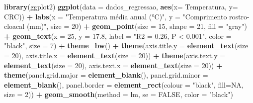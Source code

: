 \documentclass[
]{book}
\newenvironment{Shaded}{\begin{snugshade}}{\end{snugshade}}
\newcommand{\DataTypeTok}[1]{\textcolor[rgb]{0.13,0.29,0.53}{#1}}
\newcommand{\DecValTok}[1]{\textcolor[rgb]{0.00,0.00,0.81}{#1}}
\newcommand{\FloatTok}[1]{\textcolor[rgb]{0.00,0.00,0.81}{#1}}
\newcommand{\KeywordTok}[1]{\textcolor[rgb]{0.13,0.29,0.53}{\textbf{#1}}}
\newcommand{\NormalTok}[1]{#1}
\newcommand{\OperatorTok}[1]{\textcolor[rgb]{0.81,0.36,0.00}{\textbf{#1}}}
\newcommand{\OtherTok}[1]{\textcolor[rgb]{0.56,0.35,0.01}{#1}}
\newcommand{\StringTok}[1]{\textcolor[rgb]{0.31,0.60,0.02}{#1}}
\begin{document}
\begin{Shaded}
\begin{Highlighting}[]
\KeywordTok{library}\NormalTok{(ggplot2)}
\KeywordTok{ggplot}\NormalTok{(}\DataTypeTok{data =}\NormalTok{ dados_regressao, }\KeywordTok{aes}\NormalTok{(}\DataTypeTok{x=}\NormalTok{ Temperatura, }\DataTypeTok{y=}\NormalTok{ CRC)) }\OperatorTok{+}\StringTok{ }
\StringTok{  }\KeywordTok{labs}\NormalTok{(}\DataTypeTok{x =} \StringTok{"Temperatura média anual (°C)"}\NormalTok{, }\DataTypeTok{y =} \StringTok{"Comprimento rostro-cloacal (mm)"}\NormalTok{, }\DataTypeTok{size =} \DecValTok{20}\NormalTok{) }\OperatorTok{+}
\StringTok{  }\KeywordTok{geom_point}\NormalTok{(}\DataTypeTok{size =} \DecValTok{15}\NormalTok{, }\DataTypeTok{shape =} \DecValTok{21}\NormalTok{, }\DataTypeTok{fill =} \StringTok{"gray"}\NormalTok{) }\OperatorTok{+}
\StringTok{  }\KeywordTok{geom_text}\NormalTok{(}\DataTypeTok{x =} \DecValTok{25}\NormalTok{, }\DataTypeTok{y =} \FloatTok{17.8}\NormalTok{, }\DataTypeTok{label =} \StringTok{"R2 = 0.26, P < 0.001"}\NormalTok{, }\DataTypeTok{color =} \StringTok{"black"}\NormalTok{, }\DataTypeTok{size =} \DecValTok{7}\NormalTok{) }\OperatorTok{+}
\StringTok{  }\KeywordTok{theme_bw}\NormalTok{() }\OperatorTok{+}
\StringTok{  }\KeywordTok{theme}\NormalTok{(}\DataTypeTok{axis.title.y =} \KeywordTok{element_text}\NormalTok{(}\DataTypeTok{size =} \DecValTok{20}\NormalTok{), }\DataTypeTok{axis.title.x =} \KeywordTok{element_text}\NormalTok{(}\DataTypeTok{size =} \DecValTok{20}\NormalTok{)) }\OperatorTok{+}
\StringTok{  }\KeywordTok{theme}\NormalTok{(}\DataTypeTok{axis.text.y =} \KeywordTok{element_text}\NormalTok{(}\DataTypeTok{size =} \DecValTok{20}\NormalTok{), }\DataTypeTok{axis.text.x =} \KeywordTok{element_text}\NormalTok{(}\DataTypeTok{size =} \DecValTok{20}\NormalTok{)) }\OperatorTok{+}
\StringTok{  }\KeywordTok{theme}\NormalTok{(}\DataTypeTok{panel.grid.major =} \KeywordTok{element_blank}\NormalTok{(), }\DataTypeTok{panel.grid.minor =} \KeywordTok{element_blank}\NormalTok{(), }
        \DataTypeTok{panel.border =} \KeywordTok{element_rect}\NormalTok{(}\DataTypeTok{colour =} \StringTok{"black"}\NormalTok{, }\DataTypeTok{fill=}\OtherTok{NA}\NormalTok{, }\DataTypeTok{size =} \DecValTok{2}\NormalTok{)) }\OperatorTok{+}
\StringTok{  }\KeywordTok{geom_smooth}\NormalTok{(}\DataTypeTok{method =}\NormalTok{ lm, }\DataTypeTok{se =} \OtherTok{FALSE}\NormalTok{, }\DataTypeTok{color =} \StringTok{"black"}\NormalTok{) }
\end{Highlighting}
\end{Shaded}
\end{document}
